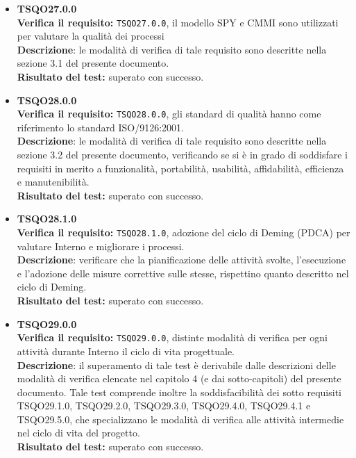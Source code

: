 \begin{itemize}
\item \textbf{TSQO27.0.0}\\
\textbf{Verifica il requisito:} \texttt{TSQO27.0.0}, il modello SPY e CMMI sono utilizzati per valutare la qualità dei processi\\
\textbf{Descrizione}: le modalità di verifica di tale requisito sono descritte nella sezione 3.1 del presente documento.\\
\textbf{Risultato del test:} superato con successo.

\item \textbf{TSQO28.0.0}\\
\textbf{Verifica il requisito:} \texttt{TSQO28.0.0}, gli standard di qualità hanno come riferimento lo standard ISO/9126:2001.\\
\textbf{Descrizione}: le modalità di verifica di tale requisito sono descritte nella sezione 3.2 del presente documento, verificando se si è in grado di soddisfare i requisiti in merito a funzionalità, portabilità, usabilità, affidabilità, efficienza e manutenibilità.\\
\textbf{Risultato del test:} superato con successo.

\item \textbf{TSQO28.1.0}\\
\textbf{Verifica il requisito:} \texttt{TSQO28.1.0}, adozione del ciclo di Deming (PDCA) per valutare Interno e migliorare i processi.\\
\textbf{Descrizione}: verificare che la pianificazione delle attività svolte, l'esecuzione e l'adozione delle misure correttive sulle stesse, rispettino quanto descritto nel ciclo di Deming.\\
\textbf{Risultato del test:} superato con successo.

\item \textbf{TSQO29.0.0}\\
\textbf{Verifica il requisito:} \texttt{TSQO29.0.0}, distinte modalità di verifica per ogni attività durante Interno il ciclo di vita progettuale.\\
\textbf{Descrizione}: il superamento di tale test è derivabile dalle descrizioni delle modalità di verifica elencate nel capitolo 4 (e dai sotto-capitoli) del presente documento. Tale test comprende inoltre la soddisfacibilità dei sotto requisiti TSQO29.1.0, TSQO29.2.0, TSQO29.3.0, TSQO29.4.0, TSQO29.4.1 e TSQO29.5.0, che specializzano le modalità di verifica alle attività intermedie nel ciclo di vita del progetto.\\
\textbf{Risultato del test:} superato con successo.


\end{itemize}

